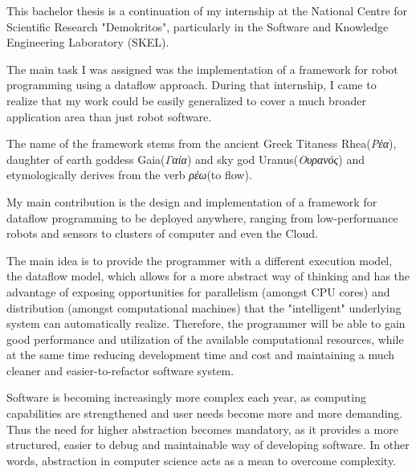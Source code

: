 \documentclass{dithesis}
\begin{document}
\begin{thesisprologue}[Prologue]

This bachelor thesis is a continuation of my internship at the National Centre for Scientific Research "Demokritos", particularly in the Software and Knowledge Engineering Laboratory (SKEL). 

The main task I was assigned was the implementation of a framework for robot programming using a dataflow approach. During that internship, I came to realize that my work could be easily generalized to cover a much broader application area than just robot software. 

The name of the framework stems from the ancient Greek Titaness Rhea(\textit{Ρέα}), daughter of earth goddess Gaia(\textit{Γαία}) and sky god Uranus(\textit{Ουρανός}) and etymologically derives from the verb \textit{ρέω}(to flow).

\end{thesisprologue}




My main contribution is the design and implementation of a framework for dataflow programming to be deployed anywhere, ranging from low-performance robots and sensors to clusters of computer and even the Cloud. 

The main idea is to provide the programmer with a different execution model, the dataflow model, which allows for a more abstract way of thinking and has the advantage of exposing opportunities for parallelism (amongst CPU cores) and distribution (amongst computational machines) that the "intelligent" underlying system can automatically realize. Therefore, the programmer will be able to gain good performance and utilization of the available computational resources, while at the same time reducing development time and cost and maintaining a much cleaner and easier-to-refactor software system.




Software is becoming increasingly more complex each year, as computing capabilities are strengthened and user needs become more and more demanding. Thus the need for higher abstraction becomes mandatory, as it provides a more structured, easier to debug and maintainable way of developing software. In other words, abstraction in computer science acts as a mean to overcome complexity. 
\end{document}
